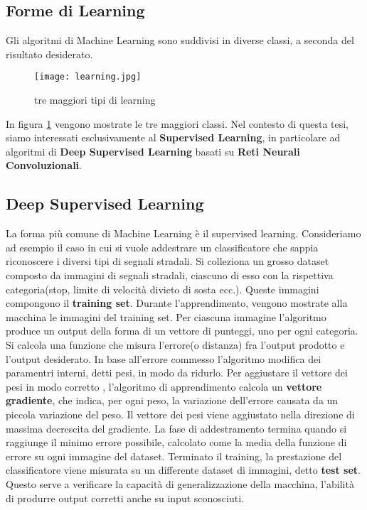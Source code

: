 \subsection{Forme di Learning}
Gli algoritmi di Machine Learning sono suddivisi in diverse classi, a seconda del risultato desiderato.
\begin{figure}
  \texttt{[image: learning.jpg]}
  \caption{tre maggiori tipi di learning\cite{learn}}
  \label{fig:ml}
\end{figure}
In figura \ref{fig:ml} vengono mostrate le tre maggiori classi. Nel contesto di questa tesi, siamo interessati esclusivamente al \textbf{Supervised Learning}, in particolare
ad algoritmi di \textbf{Deep Supervised Learning} basati su \textbf{Reti Neurali Convoluzionali}.
\subsection{Deep Supervised Learning}
La forma più comune di Machine Learning è il supervised learning. Consideriamo ad esempio il caso in cui si vuole addestrare un classificatore
che sappia riconoscere i diversi tipi di segnali stradali. Si colleziona un grosso dataset composto da immagini di segnali stradali, ciascuno di esso con la rispettiva categoria(stop, limite di velocità
divieto di sosta ecc.). Queste immagini compongono il \textbf{training set}. Durante l'apprendimento, vengono mostrate alla macchina  le immagini del training set. Per ciascuna immagine l'algoritmo produce un output della forma di un vettore di punteggi, uno per ogni categoria.
Si calcola una funzione che misura l'errore(o distanza) fra l'output prodotto e l'output desiderato. In base all'errore commesso l'algoritmo modifica dei paramentri interni, detti pesi, 
in modo da ridurlo. Per aggiustare il vettore dei pesi in modo corretto , l'algoritmo di apprendimento calcola un \textbf{vettore gradiente}, che indica, per ogni peso, la variazione dell'errore
causata da un piccola variazione del peso. Il vettore dei pesi viene aggiustato nella direzione di massima decrescita del gradiente. La fase di addestramento termina quando si raggiunge il minimo errore possibile, calcolato come la media della funzione di errore su ogni immagine del dataset.
Terminato il training, la prestazione del classificatore viene misurata su un differente dataset di immagini, detto \textbf{test set}. Questo serve a verificare
la capacità di generalizzazione della macchina, l'abilità di produrre output corretti anche su input sconosciuti.

